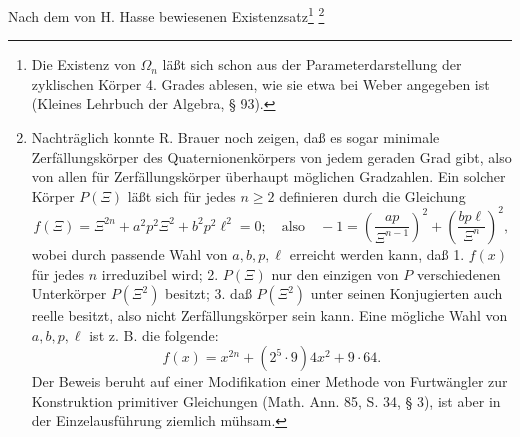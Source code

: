 Nach dem von H. Hasse bewiesenen Existenzsatz\footnote{Die Existenz von $\Omega_n$ läßt sich schon aus der Parameterdarstellung der zyklischen Körper 4. Grades ablesen, wie sie etwa bei Weber angegeben ist (Kleines Lehrbuch der Algebra, § 93).} \footnote{Nachträglich konnte R. Brauer noch zeigen, daß es sogar minimale Zerfällungskörper des Quaternionenkörpers von jedem geraden Grad gibt, also von allen für Zerfällungskörper überhaupt möglichen Gradzahlen. Ein solcher Körper $P(\Xi)$ läßt sich für jedes $n\ge2$ definieren durch die Gleichung
\[
 f(\Xi)=\Xi^{2n}+a^2p^2\Xi^2+b^2p^2\ell^2=0;
\quad \text{also}\quad -1=\left(\frac{ap}{\Xi^{n-1}}\right)^2+
        \left(\frac{bp\ell}{\Xi^n}\right)^2,
\]
wobei durch passende Wahl von $a,b,p,\ell$ erreicht werden kann, daß 1. $f(x)$ für jedes $n$ irreduzibel wird; 2. $P(\Xi)$ nur den einzigen von $P$ verschiedenen Unterkörper $P(\Xi^2)$ besitzt; 3. daß $P(\Xi^2)$ unter seinen Konjugierten auch reelle besitzt, also nicht Zerfällungskörper sein kann. Eine mögliche Wahl von $a,b,p,\ell$ ist z. B. die folgende:
\[
        f(x)=x^{2n}+(2^5\cdot9)4x^2+9\cdot64.
\]
Der Beweis beruht auf einer Modifikation einer Methode von Furtwängler zur Konstruktion primitiver Gleichungen (Math. Ann. 85, S. 34, § 3), ist aber in der Einzelausführung ziemlich mühsam.}
